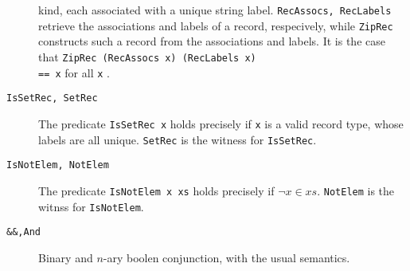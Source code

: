 \begin{description}
                            kind, each associated with a unique string label. 
                            \lstinline{RecAssocs, RecLabels} retrieve the 
                            associations and labels of a record, respecively, 
                            while \lstinline{ZipRec} constructs such a record 
                            from the associations and labels. It is the case
                            that \lstinline{ZipRec (RecAssocs x) (RecLabels x) 
                            == x} for all \lstinline{x} .
                            \item[\texttt{IsSetRec, SetRec}] The predicate 
                            \lstinline{IsSetRec x} holds precisely if 
                            \lstinline{x}
                            is a valid record type, whose labels are all 
                            unique. \lstinline{SetRec} is the witness for 
                            \lstinline{IsSetRec}. 
                            \item[\texttt{IsNotElem, NotElem}] The predicate 
                            \lstinline{IsNotElem x xs} holds precisely if 
                            $\lnot x \in xs$.
                            \lstinline{NotElem} is the witnss for 
                            \lstinline{IsNotElem}. 
                            \item[\texttt{\&\&,And}] Binary and $n$-ary boolen 
                            conjunction, with the usual semantics. 
                        \end{description}
                        
                        
                        \label{subsec:Singletons}
                        
